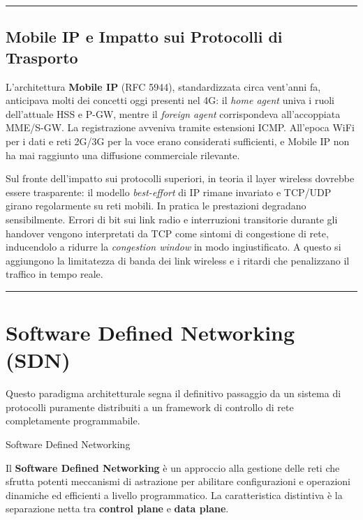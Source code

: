 \documentclass[
  italian,
  openany]{book}
\begin{document}
\begin{center}\rule{0.5\linewidth}{0.5pt}\end{center}

\section{Mobile IP e Impatto sui Protocolli di
Trasporto}\label{mobile-ip-e-impatto-sui-protocolli-di-trasporto}

L'architettura \textbf{Mobile IP} (RFC 5944), standardizzata circa
vent'anni fa, anticipava molti dei concetti oggi presenti nel 4G: il
\emph{home agent} univa i ruoli dell'attuale HSS e P-GW, mentre il
\emph{foreign agent} corrispondeva all'accoppiata MME/S-GW. La
registrazione avveniva tramite estensioni ICMP. All'epoca WiFi per i
dati e reti 2G/3G per la voce erano considerati sufficienti, e Mobile IP
non ha mai raggiunto una diffusione commerciale rilevante.

Sul fronte dell'impatto sui protocolli superiori, in teoria il layer
wireless dovrebbe essere trasparente: il modello \emph{best-effort} di
IP rimane invariato e TCP/UDP girano regolarmente su reti mobili. In
pratica le prestazioni degradano sensibilmente. Errori di bit sui link
radio e interruzioni transitorie durante gli handover vengono
interpretati da TCP come sintomi di congestione di rete, inducendolo a
ridurre la \emph{congestion window} in modo ingiustificato. A questo si
aggiungono la limitatezza di banda dei link wireless e i ritardi che
penalizzano il traffico in tempo reale.

\begin{center}\rule{0.5\linewidth}{0.5pt}\end{center}

\newpage

\chapter{Software Defined Networking
(SDN)}\label{software-defined-networking-sdn}

Questo paradigma architetturale segna il definitivo passaggio da un
sistema di protocolli puramente distribuiti a un framework di controllo
di rete completamente programmabile.

\begin{calloutdefinition}{Software Defined Networking}

Il \textbf{Software Defined Networking} è un approccio alla gestione
delle reti che sfrutta potenti meccanismi di astrazione per abilitare
configurazioni e operazioni dinamiche ed efficienti a livello
programmatico. La caratteristica distintiva è la separazione netta tra
\textbf{control plane} e \textbf{data plane}.

\end{calloutdefinition}
\end{document}
